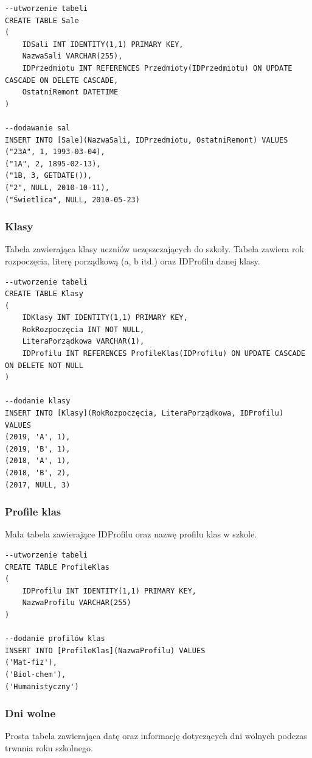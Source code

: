 \documentclass[60pt]{article}
\begin{document}
\begin{verbatim}
--utworzenie tabeli
CREATE TABLE Sale
(
	IDSali INT IDENTITY(1,1) PRIMARY KEY,
	NazwaSali VARCHAR(255),
	IDPrzedmiotu INT REFERENCES Przedmioty(IDPrzedmiotu) ON UPDATE CASCADE ON DELETE CASCADE,
	OstatniRemont DATETIME
)

--dodawanie sal
INSERT INTO [Sale](NazwaSali, IDPrzedmiotu, OstatniRemont) VALUES
("23A", 1, 1993-03-04),
("1A", 2, 1895-02-13),
("1B, 3, GETDATE()),
("2", NULL, 2010-10-11),
("Świetlica", NULL, 2010-05-23)
\end{verbatim}

 \subsubsection{Klasy}
Tabela zawierająca klasy uczniów uczęszczających do szkoły. Tabela zawiera rok rozpoczęcia, literę porządkową (a, b itd.) oraz IDProfilu danej klasy.
 
\begin{verbatim}
--utworzenie tabeli
CREATE TABLE Klasy
(
	IDKlasy INT IDENTITY(1,1) PRIMARY KEY,
	RokRozpoczęcia INT NOT NULL,
	LiteraPorządkowa VARCHAR(1),
	IDProfilu INT REFERENCES ProfileKlas(IDProfilu) ON UPDATE CASCADE ON DELETE NOT NULL
)

--dodanie klasy
INSERT INTO [Klasy](RokRozpoczęcia, LiteraPorządkowa, IDProfilu) VALUES
(2019, 'A', 1),
(2019, 'B', 1),
(2018, 'A', 1),
(2018, 'B', 2),
(2017, NULL, 3)
\end{verbatim}


 \subsubsection{Profile klas}
Mała tabela zawierające IDProfilu oraz nazwę profilu klas w szkole.
 
\begin{verbatim}
--utworzenie tabeli
CREATE TABLE ProfileKlas
(
	IDProfilu INT IDENTITY(1,1) PRIMARY KEY,
	NazwaProfilu VARCHAR(255)
)

--dodanie profilów klas
INSERT INTO [ProfileKlas](NazwaProfilu) VALUES
('Mat-fiz'),
('Biol-chem'),
('Humanistyczny')
\end{verbatim}

 \subsubsection{Dni wolne}
Prosta tabela zawierająca datę oraz informację dotyczących dni wolnych podczas trwania roku szkolnego.
 
\end{document}
